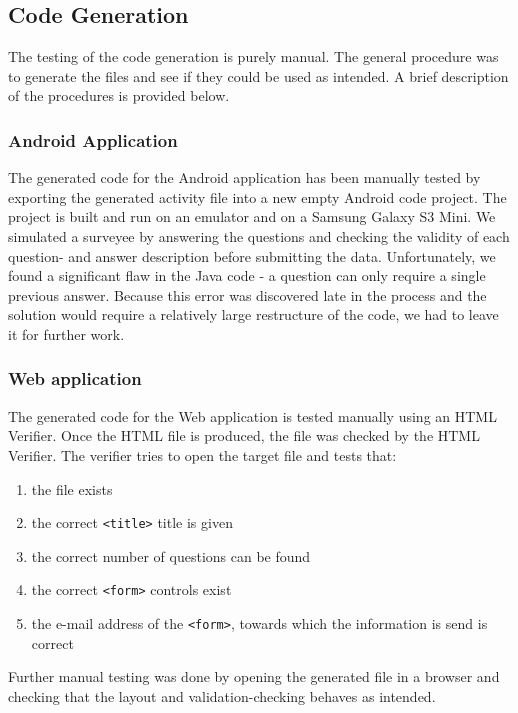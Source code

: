 \documentclass[runningheads]{llncs}
\begin{document}
\subsection{Code Generation}
The testing of the code generation is purely manual. The general procedure was to generate the files and see if they could be used as intended. A brief description of the procedures is provided below.
\subsubsection{Android Application}
The generated code for the Android application has been manually tested by exporting the generated activity file into a new empty Android code project. The project is built and run on an emulator and on a Samsung Galaxy S3 Mini. We simulated a surveyee by answering the questions and checking the validity of each question- and answer description before submitting the data. Unfortunately, we found a significant flaw in the Java code - a question can only require a single previous answer. Because this error was discovered late in the process and the solution would require a relatively large restructure of the code, we had to leave it for further work. 
\subsubsection{Web application}
The generated code for the Web application is tested manually using an HTML Verifier. Once the HTML file is produced, the file was checked by the HTML Verifier. The verifier tries to open the target file and tests that:
\begin{enumerate}
\item the file exists
\item the correct \texttt{<title>} title is given
\item the correct number of questions can be found
\item the correct \texttt{<form>} controls exist
\item the e-mail address of the \texttt{<form>}, towards which the information is send is correct
\end{enumerate}
Further manual testing was done by opening the generated file in a browser and checking that the layout and validation-checking behaves as intended.
\end{document}
